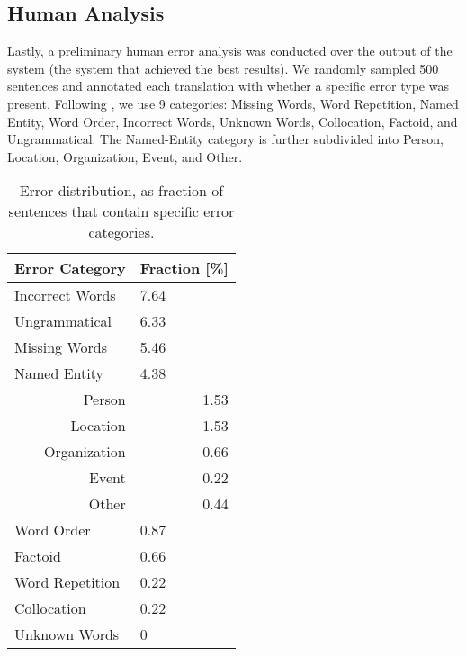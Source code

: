 \documentclass[a4paper]{article}
\begin{document}
\begin{CJK*}{UTF8}{gbsn}
\section{Human Analysis}
\label{human-analysis}
Lastly, a preliminary human error analysis was conducted over the output of the \ComboC{} system (the system that achieved the best results). We randomly sampled 500 sentences and annotated each translation with whether a specific error type was present. Following \cite{ErrorAnalysis}, we use 9 categories: Missing Words, Word Repetition, Named Entity, Word Order, Incorrect Words, Unknown Words, Collocation, Factoid, and Ungrammatical. The Named-Entity category is further subdivided into Person, Location, Organization, Event, and Other.


\begin{table}[htb]
\centering
\begin{tabular}{@{}p{4cm}l@{}}
\toprule
\textbf{Error Category}            & \textbf{Fraction [\%]}    \\
\midrule
Incorrect Words                    & 7.64                      \\
Ungrammatical                      & 6.33                      \\
Missing Words                      & 5.46                      \\
Named Entity                       & 4.38                      \\ 
\multicolumn{1}{r}{Person\hspace*{2em}}         & \multicolumn{1}{r}{1.53}  \\
\multicolumn{1}{r}{Location\hspace*{2em}}       & \multicolumn{1}{r}{1.53}  \\
\multicolumn{1}{r}{Organization\hspace*{2em}}   & \multicolumn{1}{r}{0.66}  \\
\multicolumn{1}{r}{Event\hspace*{2em}}          & \multicolumn{1}{r}{0.22}  \\
\multicolumn{1}{r}{Other\hspace*{2em}}          & \multicolumn{1}{r}{0.44}  \\
Word Order                         & 0.87                      \\
Factoid                            & 0.66                      \\
Word Repetition                    & 0.22                      \\
Collocation                        & 0.22                      \\
Unknown Words                      & 0                         \\
\bottomrule
\end{tabular}
\caption{Error distribution, as fraction of sentences that contain specific error categories.}
\label{my-ana}
\end{table}


\end{CJK*}
\end{document}
